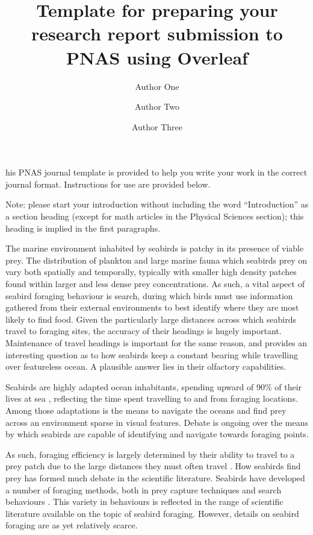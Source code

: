\documentclass[9pt,twocolumn,twoside,lineno]{pnas-new}
\title{Template for preparing your research report submission to PNAS using Overleaf}
\author[a,c,1]{Author One}
\author[b,1,2]{Author Two}
\author[a]{Author Three}
\affil[a]{Affiliation One}
\affil[b]{Affiliation Two}
\affil[c]{Affiliation Three}
\begin{document}
\maketitle
\thispagestyle{firststyle}

his PNAS journal template is provided to help you write your work in the correct journal format. Instructions for use are provided below. 

Note: please start your introduction without including the word ``Introduction'' as a section heading (except for math articles in the Physical Sciences section); this heading is implied in the first paragraphs. 

The marine environment inhabited by seabirds is patchy in its presence of viable prey. The distribution of plankton and large marine fauna which seabirds prey on vary both spatially and temporally, typically with smaller high density patches found within larger and less dense prey concentrations. As such, a vital aspect of seabird foraging behaviour is search, during which birds must use information gathered from their external environments to best identify where they are most likely to find food. Given the particularly large distances across which seabirds travel to foraging sites, the accuracy of their headings is hugely important. Maintenance of travel headings is important for the same reason, and provides an interesting question as to how seabirds keep a constant bearing while travelling over featureless ocean. A plausible answer lies in their olfactory capabilities.

Seabirds are highly adapted ocean inhabitants, spending upward of 90\% of their lives at sea \citep{Balance_2019}, reflecting the time spent travelling to and from foraging locations. Among those adaptations is the means to navigate the oceans and find prey across an environment sparse in visual features. Debate is ongoing over the means by which seabirds are capable of identifying and navigate towards foraging points. 

As such, foraging efficiency is largely determined by their ability to travel to a prey patch due to the large distances they must often travel \citep{Weimerskirch_2003}. How seabirds find prey has formed much debate in the scientific literature. Seabirds have developed a number of foraging methods, both in prey capture techniques and search behaviours \citep{Shealer_2001}. This variety in behaviours is reflected in the range of scientific literature available on the topic of seabird foraging. However, details on seabird foraging are as yet relatively scarce. 
\end{document}
